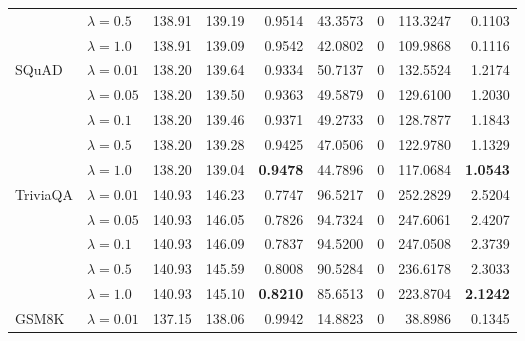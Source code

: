 \begin{table}[t]
{\begin{tabular}{l l rrrrrrr}
 & $\lambda{=}0.5$ & 138.91 & 139.19 & 0.9514 & 43.3573 & \cellcolor{cyan!12} $0$ & 113.3247 & 0.1103 \\
 & $\lambda{=}1.0$ & 138.91 & 139.09 & 0.9542 & 42.0802 & \cellcolor{cyan!12} $0$ & 109.9868 & 0.1116 \\
\midrule
SQuAD & $\lambda{=}0.01$ & 138.20 & 139.64 & \cellcolor{red!18} 0.9334 & \cellcolor{red!18} 50.7137 & \cellcolor{cyan!12} $0$ & \cellcolor{red!18} 132.5524 & \cellcolor{red!18} 1.2174 \\
 & $\lambda{=}0.05$ & 138.20 & 139.50 & \cellcolor{red!18} 0.9363 & \cellcolor{red!18} 49.5879 & \cellcolor{cyan!12} $0$ & \cellcolor{red!18} 129.6100 & \cellcolor{red!18} 1.2030 \\
 & $\lambda{=}0.1$ & 138.20 & 139.46 & \cellcolor{red!18} 0.9371 & \cellcolor{red!18} 49.2733 & \cellcolor{cyan!12} $0$ & \cellcolor{red!18} 128.7877 & \cellcolor{red!18} 1.1843 \\
 & $\lambda{=}0.5$ & 138.20 & 139.28 & \cellcolor{red!18} 0.9425 & \cellcolor{red!18} 47.0506 & \cellcolor{cyan!12} $0$ & \cellcolor{red!18} 122.9780 & \cellcolor{red!18} 1.1329 \\
 & $\lambda{=}1.0$ & 138.20 & 139.04 & \cellcolor{red!18} \textbf{0.9478} & \cellcolor{red!18} 44.7896 & \cellcolor{cyan!12} $0$ & \cellcolor{red!18} 117.0684 & \cellcolor{red!18} \textbf{1.0543} \\
\midrule
TriviaQA & $\lambda{=}0.01$ & 140.93 & 146.23 & \cellcolor{red!35} 0.7747 & \cellcolor{red!35} 96.5217 & \cellcolor{cyan!12} $0$ & \cellcolor{red!35} 252.2829 & \cellcolor{red!35} 2.5204 \\
 & $\lambda{=}0.05$ & 140.93 & 146.05 & \cellcolor{red!35} 0.7826 & \cellcolor{red!35} 94.7324 & \cellcolor{cyan!12} $0$ & \cellcolor{red!35} 247.6061 & \cellcolor{red!35} 2.4207 \\
 & $\lambda{=}0.1$ & 140.93 & 146.09 & \cellcolor{red!35} 0.7837 & \cellcolor{red!35} 94.5200 & \cellcolor{cyan!12} $0$ & \cellcolor{red!35} 247.0508 & \cellcolor{red!35} 2.3739 \\
 & $\lambda{=}0.5$ & 140.93 & 145.59 & \cellcolor{red!18} 0.8008 & \cellcolor{red!18} 90.5284 & \cellcolor{cyan!12} $0$ & \cellcolor{red!18} 236.6178 & \cellcolor{red!18} 2.3033 \\
 & $\lambda{=}1.0$ & 140.93 & 145.10 & \cellcolor{red!18} \textbf{0.8210} & \cellcolor{red!18} 85.6513 & \cellcolor{cyan!12} $0$ & \cellcolor{red!18} 223.8704 & \cellcolor{red!18} \textbf{2.1242} \\
\midrule
GSM8K & $\lambda{=}0.01$ & 137.15 & 138.06 & 0.9942 & 14.8823 & \cellcolor{cyan!12} $0$ & 38.8986 & 0.1345 \\

\end{tabular}}
\end{table}

